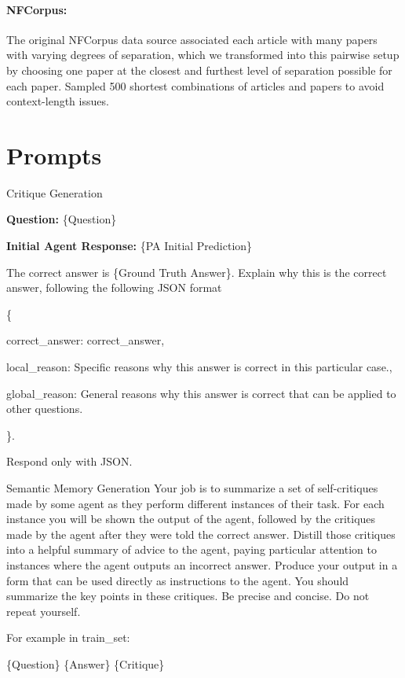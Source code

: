 \paragraph{NFCorpus:} The original NFCorpus data source associated each article with many papers with varying degrees of separation, which we transformed into this pairwise setup by choosing one paper at the closest and furthest level of separation possible for each paper. Sampled 500 shortest combinations of articles and papers to avoid context-length issues.

\section{Prompts}


\begin{promptbox}{Critique Generation} 
\small

\textbf{Question:} \{Question\}

\textbf{Initial Agent Response:} \{PA Initial Prediction\}

The correct answer is \{Ground Truth Answer\}. Explain why this is the correct answer, following the following JSON format\: 

\{

\quad correct\_answer: correct\_answer, 

\quad local\_reason: Specific reasons why this answer is correct in this particular case., 

\quad global\_reason: General reasons why this answer is correct that can be applied to other questions.

\}. 

Respond only with JSON.
\end{promptbox}

\begin{promptbox}{Semantic Memory Generation} 
\small
Your job is to summarize a set of self-critiques made by some agent as they perform different instances of their task.  For each instance you will be shown the output of the agent, followed by the critiques made by the agent after they were told the correct answer.  Distill those critiques into a helpful summary of advice to the agent, paying particular attention to instances where the agent outputs an incorrect answer. Produce your output in a form that can be used directly as instructions to the agent. You should summarize the key points in these critiques.  Be precise and concise.  Do not repeat yourself.

For example in train\_set:

\quad \{Question\} \{Answer\} \{Critique\} 

\end{promptbox}


